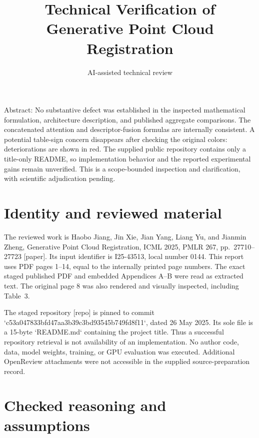 \documentclass[10pt]{article}
\title{Technical Verification of
Generative Point Cloud Registration}
\author{AI-assisted technical review}
\date{}
\begin{document}
\maketitle
Abstract: No substantive defect was established in the inspected mathematical formulation, architecture description, and published aggregate comparisons. The concatenated attention and descriptor-fusion formulas are internally consistent. A potential table-sign concern disappears after checking the original colors: deteriorations are shown in red. The supplied public repository contains only a title-only README, so implementation behavior and the reported experimental gains remain unverified. This is a scope-bounded inspection and clarification, with scientific adjudication pending.\par
\section*{Identity and reviewed material}
The reviewed work is Haobo Jiang, Jin Xie, Jian Yang, Liang Yu, and Jianmin Zheng, Generative Point Cloud Registration, ICML 2025, PMLR 267, pp. 27710–27723 [paper]. Its input identifier is I25-43513, local number 0144. This report uses PDF pages 1–14, equal to the internally printed page numbers. The exact staged published PDF and embedded Appendices A–B were read as extracted text. The original page 8 was also rendered and visually inspected, including Table 3.\par
The staged repository [repo] is pinned to commit `c53a047833bfd47aa3b39c3bd93545b749fd8f11`, dated 26 May 2025. Its sole file is a 15-byte `README.md` containing the project title. Thus a successful repository retrieval is not availability of an implementation. No author code, data, model weights, training, or GPU evaluation was executed. Additional OpenReview attachments were not accessible in the supplied source-preparation record.\par
\section*{Checked reasoning and assumptions}
\end{document}
